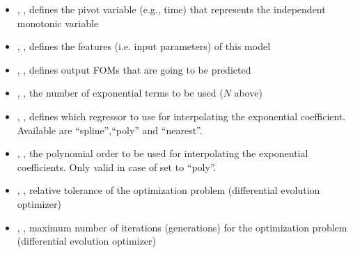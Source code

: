 \begin{itemize}
  \item {}, , defines the pivot variable (e.g., time) that represents the
  independent monotonic variable
  \item {}, , defines the features (i.e. input parameters) of this
  model
  \item {}, , defines output FOMs that are going to be predicted
  \item {}, , the number of exponential terms to be used ($N$ above)
  \item {}, , defines which regressor to use for interpolating the
   exponential coefficient. Available are ``spline'',``poly'' and ``nearest''.
  \item {}, , the polynomial order to be used for interpolating the exponential
  coefficients. Only valid in case of   set to ``poly''.
  \item {}, , relative tolerance of the optimization problem (differential evolution optimizer)
  \item {}, , maximum number of iterations (generations) for the
  optimization problem  (differential evolution optimizer)
\end{itemize}

